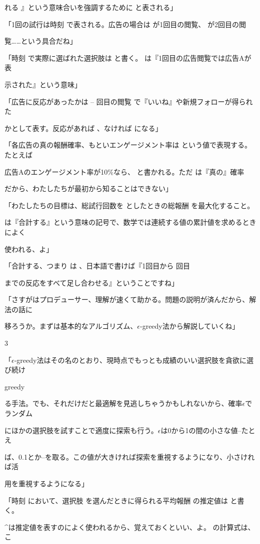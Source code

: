 れる 』という意味合いを強調するために と表される」\par
「1回の試⾏は時刻 で表される。広告の場合は が1回⽬の閲覧、 が2回⽬の閲\par
覧……という具合だね」\par
「時刻 で実際に選ばれた選択肢は と書く。 は『1回⽬の広告閲覧では広告Aが表\par
⽰された』という意味」\par
「広告に反応があったかは -- 回⽬の閲覧 で『いいね』や新規フォローが得られた\par
かとして表す。反応があれば 、なければ になる」\par
「各広告の真の報酬確率、もといエンゲージメント率は という値で表現する。たとえば\par
広告Aのエンゲージメント率が10\%なら、 と書かれる。ただ は『真の』確率\par
だから、わたしたちが最初から知ることはできない」\par
「わたしたちの⽬標は、総試⾏回数を としたときの総報酬 を最⼤化すること。\par
は『合計する』という意味の記号で、数学では連続する値の累計値を求めるときによく\par
使われる、よ」\par
「合計する、つまり は 、⽇本語で書けば『1回⽬から 回⽬\par
までの反応をすべて⾜し合わせる』ということですね」\par
「さすがはプロデューサー、理解が速くて助かる。問題の説明が済んだから、解法の話に\par
移ろうか。まずは基本的なアルゴリズム、$\epsilon$-greedy法から解説していくね」\par
3\par
「$\epsilon$-greedy法はその名のとおり、現時点でもっとも成績のいい選択肢を貪欲に選び続け\par
greedy\par
る⼿法。でも、それだけだと最適解を⾒逃しちゃうかもしれないから、確率$\epsilon$でランダム\par
にほかの選択肢を試すことで適度に探索も⾏う。$\epsilon$は0から1の間の⼩さな値--たとえ\par
ば、0.1とか--を取る。この値が⼤きければ探索を重視するようになり、⼩さければ活\par
⽤を重視するようになる」\par
「時刻 において、選択肢 を選んだときに得られる平均報酬 の推定値は と書く。\par
\textasciicircum{}は推定値を表すのによく使われるから、覚えておくといい、よ。 の計算式は、こ\par
